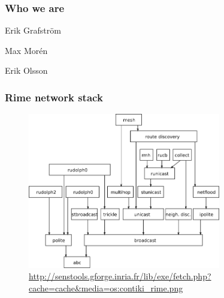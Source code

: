 \documentclass{beamer}
\begin{document}
\begin{frame} 
\frametitle{Who we are}

	\begin{block}

		Erik Grafström

	\end{block}

	\begin{block}

		Max Morén
	
	\end{block}
	
	\begin{block}
	
		Erik Olsson

	\end{block}

\end{frame} 

\begin{frame}
\frametitle{Rime network stack}

	\begin{center}
		\begin{figure}
			\includegraphics[width=0.75\textwidth]{images/rime.png}
			\caption{\url{http://senstools.gforge.inria.fr/lib/exe/fetch.php?cache=cache&media=os:contiki_rime.png}}
			\label{fig:rime}
		\end{figure}
	\end{center}

\end{frame}
\end{document}
